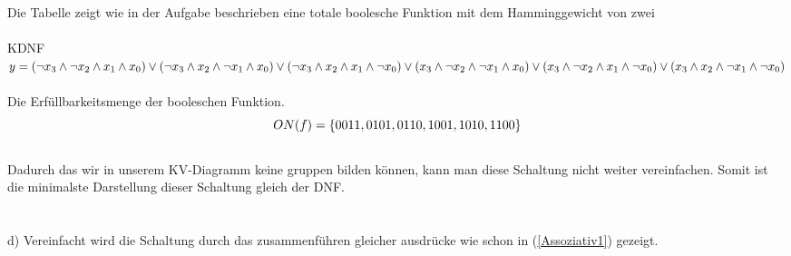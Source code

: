 \documentclass[11pt,a4paper]{article}
\begin{document}
Die Tabelle zeigt wie in der Aufgabe beschrieben eine totale boolesche Funktion mit dem Hamminggewicht von zwei\\ \\
KDNF \\
$\label{KDNF:KDNF}
y=(\neg x_3 \wedge \neg x_2 \wedge x_1 \wedge x_0)\vee ( \neg x_3 \wedge x_2 \wedge \neg x_1 \wedge  x_0) \vee ( \neg x_3 \wedge x_2 \wedge x_1 \wedge \neg x_0) \vee \\ ( x_3 \wedge \neg x_2 \wedge \neg x_1 \wedge x_0) \vee (x_3 \wedge \neg x_2 \wedge x_1 \wedge \neg x_0) \vee ( x_3 \wedge x_2 \wedge \neg x_1 \wedge \neg x_0) $\\
\\
Die Erfüllbarkeitsmenge der booleschen Funktion. 
\begin{displaymath}
ON(f)=\lbrace0011,0101,0110,1001,1010,1100\rbrace\\
\end{displaymath}
\\
Dadurch das wir in unserem KV-Diagramm keine gruppen bilden können, kann man diese Schaltung nicht weiter vereinfachen. Somit ist die minimalste Darstellung dieser Schaltung gleich der DNF.\\
\\ \\
d)
Vereinfacht wird die Schaltung durch das zusammenführen gleicher ausdrücke wie schon in (\ref{Assoziativ1}) gezeigt.
\end{document}
